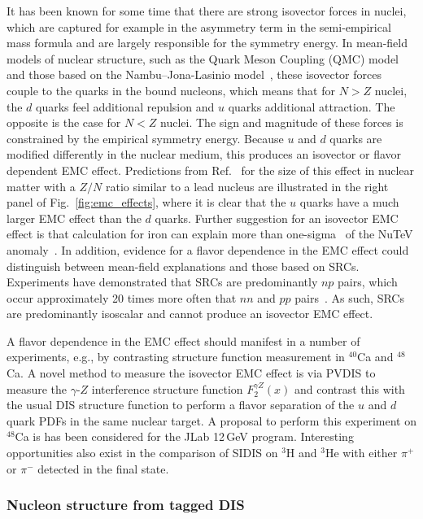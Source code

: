 It has been known for some time that there are strong isovector forces in nuclei, which are captured for example in the asymmetry term in the semi-empirical mass formula and are largely responsible for the symmetry energy. In mean-field models of nuclear structure, such as the Quark Meson Coupling (QMC) model~\cite{Guichon:2004xg,Guichon:2006er,Tronchin:2018mvu} and those based on the Nambu--Jona-Lasinio model~\cite{Bentz:2001vc,Cloet:2005rt,Cloet:2006bq}, these isovector forces couple to the quarks in the bound nucleons, which means that for $N > Z$ nuclei, the $d$ quarks feel additional repulsion and $u$ quarks additional attraction. The opposite is the case for $N < Z$ nuclei. The sign and magnitude of these forces is constrained by the empirical symmetry energy. Because $u$ and $d$ quarks are modified differently in the nuclear medium, this produces an isovector or flavor dependent EMC effect. Predictions from Ref.~\cite{Cloet:2012td} for the size of this effect in nuclear matter with a $Z/N$ ratio similar to a lead nucleus are illustrated in the right panel of Fig.~\ref{fig:emc_effects}, where it is clear that the $u$ quarks have a much larger EMC effect than the $d$ quarks. Further suggestion for an isovector EMC effect is that calculation for iron can explain more than one-sigma~\cite{Cloet:2009qs,Bentz:2009yy} of the NuTeV anomaly~\cite{Zeller:2001hh}. In addition, evidence for a flavor dependence in the EMC effect could distinguish between mean-field explanations and those based on SRCs. Experiments have demonstrated that SRCs are predominantly $np$ pairs, which occur approximately 20 times more often that $nn$ and $pp$ pairs~\cite{Hen:2016kwk}. As such, SRCs are predominantly isoscalar and cannot produce an isovector EMC effect.

A flavor dependence in the EMC effect should manifest in a number of experiments, e.g., by contrasting structure function measurement in $^{40}$Ca and $^{48}$Ca. A novel method to measure the isovector EMC effect is via PVDIS to measure the $\gamma$-$Z$ interference structure function $F_2^{\gamma Z}(x)$ and contrast this with the usual DIS structure function to perform a flavor separation of the $u$ and $d$ quark PDFs in the same nuclear target. A proposal to perform this experiment on $^{48}$Ca is has been considered for the JLab 12\,GeV program. Interesting opportunities also exist in the comparison of SIDIS on $^3$H and $^3$He with either $\pi^+$ or $\pi^-$ detected in the final state.



\subsubsection{Nucleon structure from tagged DIS}

